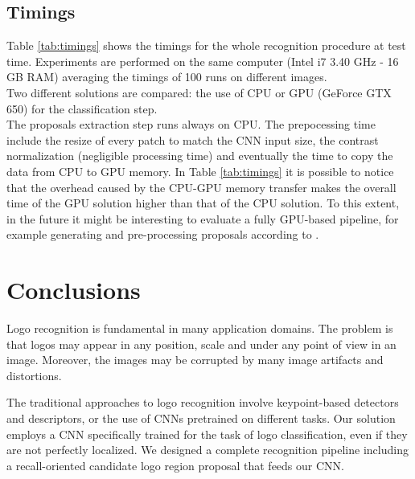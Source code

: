\documentclass[final,5p,twocolumn]{elsarticle}
\begin{document}
\subsection{Timings}

\begin{table}[htbp]
	\caption{Timings of the whole recognition pipeline}
	\label{tab:timings}
	\centering
{}
\end{table}
Table \ref{tab:timings} shows the timings for the whole recognition procedure at test time. Experiments are performed on the same computer (Intel i7 3.40 GHz - 16 GB RAM) averaging the timings of 100 runs on different images.\\
Two different solutions are compared: the use of CPU or GPU (GeForce GTX 650) for the classification step.\\
The proposals extraction step runs always on CPU. The prepocessing time include the resize of every patch to match the CNN input size, the contrast normalization (negligible processing time) and eventually the time to copy the data from CPU to GPU memory. In Table \ref{tab:timings} it is possible to notice that the overhead caused by the CPU-GPU memory transfer makes the overall time of the GPU solution higher than that of the CPU solution. {To this extent, in the future it might be interesting to evaluate a fully GPU-based pipeline, for example generating and pre-processing proposals according to \cite{ren2015faster}.}


\section{Conclusions}
\label{sec:conclusions}
Logo recognition is fundamental in many application domains. The problem is that logos may appear in any position, scale and under any point of view in an image. Moreover, the images may be corrupted by many image artifacts and distortions. 

The traditional approaches to logo recognition involve keypoint-based detectors and descriptors, or the use of  CNNs pretrained on different tasks. Our solution employs a CNN specifically trained for the task of logo classification, even if they are not perfectly localized.
We designed a complete recognition pipeline including a recall-oriented candidate logo region proposal that feeds our CNN.
\end{document}
